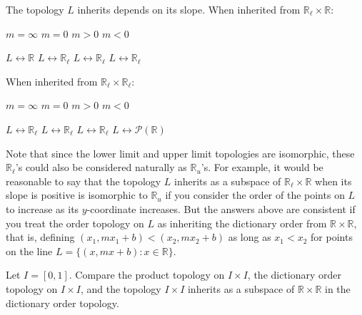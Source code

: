 \documentclass[11pt]{article}
\begin{document}
\begin{solution}
  The topology $L$ inherits depends on its slope. When inherited from
  $\mathbb{R}_\ell \times \mathbb{R}$:

  \vspace{3in}

  $m = \infty$
    \hfill $m = 0$
    \hfill $m > 0$
    \hfill $m < 0$

  $L \longleftrightarrow \mathbb{R}$
    \hfill $L \longleftrightarrow \mathbb{R}_\ell$
    \hfill $L \longleftrightarrow \mathbb{R}_\ell$
    \hfill $L \longleftrightarrow \mathbb{R}_\ell$

  \newpage

  When inherited from $\mathbb{R}_\ell \times \mathbb{R}_\ell$:

  \vspace{3in}
  $m = \infty$ 
    \hfill $m = 0$ 
    \hfill $m > 0$ 
    \hfill $m < 0$

  $L \longleftrightarrow \mathbb{R}_\ell$
    \hfill $L \longleftrightarrow \mathbb{R}_\ell$
    \hfill $L \longleftrightarrow \mathbb{R}_\ell$
    \hfill $L \longleftrightarrow \mathcal{P}(\mathbb{R})$

  Note that since the lower limit and upper limit topologies are isomorphic,
  these $\mathbb{R}_\ell$'s could also be considered naturally as
  $\mathbb{R}_u$'s. For example, it would be reasonable to say that the topology
  $L$ inherits as a subspace of $\mathbb{R}_\ell \times \mathbb{R}$ when its
  slope is positive is isomorphic to $\mathbb{R}_u$ if you consider the order of
  the points on $L$ to increase as its $y$-coordinate increases.
  But the answers above are consistent if you treat the order
  topology on $L$ as inheriting the dictionary order from $\mathbb{R} \times
  \mathbb{R}$, that is, defining $(x_1, mx_1 + b) < (x_2, mx_2 + b)$ as long as $x_1 <
  x_2$ for points on the line $L = \{(x, mx + b) : x \in \mathbb{R}\}$.
\end{solution}


\begin{ex}{16.10}
  Let $I = [0, 1]$. Compare the product topology on $I \times I$, the dictionary
  order topology on $I \times I$, and the topology $I \times I$ inherits as a
  subspace of $\mathbb{R} \times \mathbb{R}$ in the dictionary order topology.
\end{ex}
\end{document}
